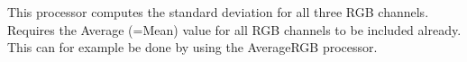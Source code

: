This processor computes the standard deviation for all three RGB channels. Requires the Average (=Mean) value for all RGB channels to be included already. This can for example be done by using the AverageRGB processor.
